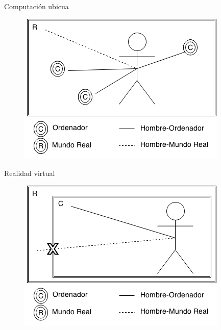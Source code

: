 \begin{slide}
  Computación ubicua
  \begin{figure}[!h]
    \begin{center}
      \includegraphics[height=0.6\textheight]{img/CU.png}
    \end{center}
  \end{figure}
\end{slide}

\begin{slide}
  Realidad virtual
  \begin{figure}[!h]
    \begin{center}
      \includegraphics[height=0.6\textheight]{img/RV.png}
    \end{center}
  \end{figure}
\end{slide}

